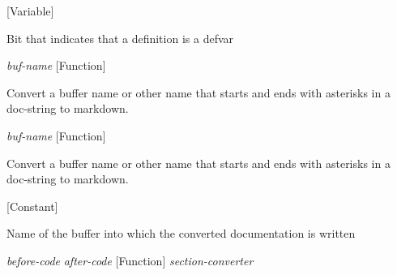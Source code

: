 \vspace{1em}
\noindent
{}
\usebox{\funcname}
 \hfill [Variable]

\begin{doc-string}
Bit that indicates that a definition is a defvar
\end{doc-string}

\vspace{1em}
\noindent
{}
\usebox{\funcname}\emph{buf-name}
 \hfill [Function]

\begin{doc-string}
Convert a buffer name or other name that starts and ends with asterisks
 in a doc-string to markdown.
\end{doc-string}

\vspace{1em}
\noindent
{}
\usebox{\funcname}\emph{buf-name}
 \hfill [Function]

\begin{doc-string}
Convert a buffer name or other name that starts and ends with asterisks
 in a doc-string to markdown.
\end{doc-string}

\vspace{1em}
\noindent
{}
\usebox{\funcname}
 \hfill [Constant]

\begin{doc-string}
Name of the buffer into which the converted documentation is written
\end{doc-string}

\vspace{1em}
\noindent
{}
\usebox{\funcname}\emph{before-code} \emph{after-code}
 \hfill [Function]
\hspace*{\wd\funcname}\emph{section-converter}

